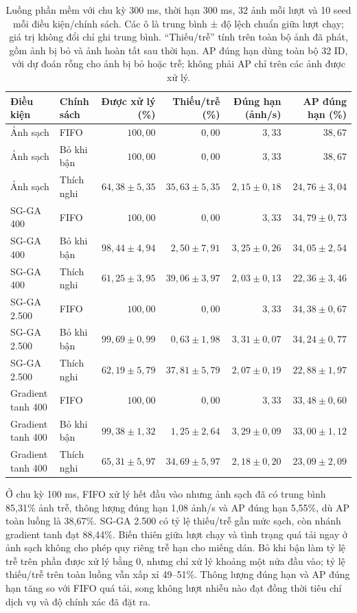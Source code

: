 \documentclass[a4paper,fleqn]{cas-dc}
\begin{document}
\begin{table}[t]
\centering
\small
\caption{Luồng phần mềm với chu kỳ 300 ms, thời hạn 300 ms, 32 ảnh mỗi lượt và 10 seed mỗi điều kiện/chính sách. Các ô là trung bình ± độ lệch chuẩn giữa lượt chạy; giá trị không đổi chỉ ghi trung bình. “Thiếu/trễ” tính trên toàn bộ ảnh đã phát, gồm ảnh bị bỏ và ảnh hoàn tất sau thời hạn. AP đúng hạn dùng toàn bộ 32 ID, với dự đoán rỗng cho ảnh bị bỏ hoặc trễ; không phải AP chỉ trên các ảnh được xử lý.}
\begin{tabularx}{\textwidth}{XXrrrr}
\toprule
Điều kiện & Chính sách & Được xử lý (\%) & Thiếu/trễ (\%) & Đúng hạn (ảnh/s) & AP đúng hạn (\%) \\
\midrule
Ảnh sạch & FIFO & $100{,}00$ & $0{,}00$ & $3{,}33$ & $38{,}67$ \\
Ảnh sạch & Bỏ khi bận & $100{,}00$ & $0{,}00$ & $3{,}33$ & $38{,}67$ \\
Ảnh sạch & Thích nghi & $64{,}38\pm5{,}35$ & $35{,}63\pm5{,}35$ & $2{,}15\pm0{,}18$ & $24{,}76\pm3{,}04$ \\
SG-GA 400 & FIFO & $100{,}00$ & $0{,}00$ & $3{,}33$ & $34{,}79\pm0{,}73$ \\
SG-GA 400 & Bỏ khi bận & $98{,}44\pm4{,}94$ & $2{,}50\pm7{,}91$ & $3{,}25\pm0{,}26$ & $34{,}05\pm2{,}54$ \\
SG-GA 400 & Thích nghi & $61{,}25\pm3{,}95$ & $39{,}06\pm3{,}97$ & $2{,}03\pm0{,}13$ & $22{,}36\pm3{,}46$ \\
SG-GA 2.500 & FIFO & $100{,}00$ & $0{,}00$ & $3{,}33$ & $34{,}38\pm0{,}67$ \\
SG-GA 2.500 & Bỏ khi bận & $99{,}69\pm0{,}99$ & $0{,}63\pm1{,}98$ & $3{,}31\pm0{,}07$ & $34{,}24\pm0{,}77$ \\
SG-GA 2.500 & Thích nghi & $62{,}19\pm5{,}79$ & $37{,}81\pm5{,}79$ & $2{,}07\pm0{,}19$ & $22{,}88\pm1{,}97$ \\
Gradient tanh 400 & FIFO & $100{,}00$ & $0{,}00$ & $3{,}33$ & $33{,}48\pm0{,}60$ \\
Gradient tanh 400 & Bỏ khi bận & $99{,}38\pm1{,}32$ & $1{,}25\pm2{,}64$ & $3{,}29\pm0{,}09$ & $33{,}00\pm1{,}12$ \\
Gradient tanh 400 & Thích nghi & $65{,}31\pm5{,}97$ & $34{,}69\pm5{,}97$ & $2{,}18\pm0{,}20$ & $23{,}09\pm2{,}09$ \\
\bottomrule
\end{tabularx}
\label{tab:extended_stream_300}
\end{table}

Ở chu kỳ 100 ms, FIFO xử lý hết đầu vào nhưng ảnh sạch đã có trung bình 85,31\% ảnh trễ, thông lượng đúng hạn 1,08 ảnh/s và AP đúng hạn 5,55\%, dù AP toàn luồng là 38,67\%. SG-GA 2.500 có tỷ lệ thiếu/trễ gần mức sạch, còn nhánh gradient tanh đạt 88,44\%. Biến thiên giữa lượt chạy và tình trạng quá tải ngay ở ảnh sạch không cho phép quy riêng trễ hạn cho miếng dán. Bỏ khi bận làm tỷ lệ trễ trên phần được xử lý bằng 0, nhưng chỉ xử lý khoảng một nửa đầu vào; tỷ lệ thiếu/trễ trên toàn luồng vẫn xấp xỉ 49--51\%. Thông lượng đúng hạn và AP đúng hạn tăng so với FIFO quá tải, song không lượt nhiễu nào đạt đồng thời tiêu chí dịch vụ và độ chính xác đã đặt ra.
\end{document}
